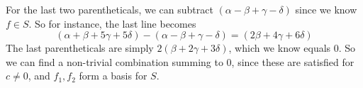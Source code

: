 \documentclass[]{article}
\begin{document}
\begin{enumerate}[resume]
\begin{enumerate}
        For the last two parentheticals, we can subtract $(\alpha -
        \beta + \gamma - \delta)$ since we know $f \in S$. So for
        instance, the last line becomes
        \[
        (\alpha + \beta + 5 \gamma + 5 \delta) - (\alpha - \beta + \gamma - \delta) = (2\beta + 4\gamma + 6 \delta)
        \]
        The last parentheticals are simply $2(\beta + 2\gamma +
        3\delta)$, which we know equals 0. So we can find a
        non-trivial combination summing to 0, since these are
        satisfied for $c \neq 0$, and $f_1, f_2$ form a basis for $S$.
        
	  \end{enumerate}
    \end{enumerate}
\end{document}
